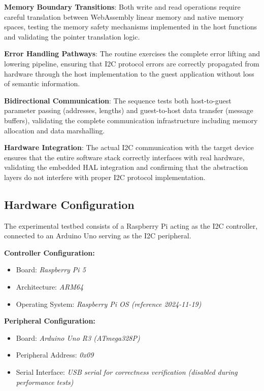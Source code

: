 \textbf{Memory Boundary Transitions}: Both write and read operations require careful translation between WebAssembly linear memory and native memory spaces, testing the memory safety mechanisms implemented in the host functions and validating the pointer translation logic.

\textbf{Error Handling Pathways}: The routine exercises the complete error lifting and lowering pipeline, ensuring that I2C protocol errors are correctly propagated from hardware through the host implementation to the guest application without loss of semantic information.

\textbf{Bidirectional Communication}: The sequence tests both host-to-guest parameter passing (addresses, lengths) and guest-to-host data transfer (message buffers), validating the complete communication infrastructure including memory allocation and data marshalling.

\textbf{Hardware Integration}: The actual I2C communication with the target device ensures that the entire software stack correctly interfaces with real hardware, validating the embedded HAL integration and confirming that the abstraction layers do not interfere with proper I2C protocol implementation.

\subsection{Hardware Configuration}
\label{subsec:eval-setup-hw}

The experimental testbed consists of a Raspberry Pi acting as the I2C controller, connected to an Arduino Uno serving as the I2C peripheral.

\textbf{Controller Configuration:}
\begin{itemize}
    \item Board: \textit{Raspberry Pi 5}~\cite{rpi5_specs}
    \item Architecture: \textit{ARM64}
    \item Operating System: \textit{Raspberry Pi OS (reference 2024-11-19)}~\cite{pi_os}
\end{itemize}

\textbf{Peripheral Configuration:}
\begin{itemize}
    \item Board: \textit{Arduino Uno R3 (ATmega328P)}~\cite{uno_specs}
    \item Peripheral Address: \textit{0x09}
    \item Serial Interface: \textit{USB serial for correctness verification (disabled during performance tests)}
\end{itemize}

